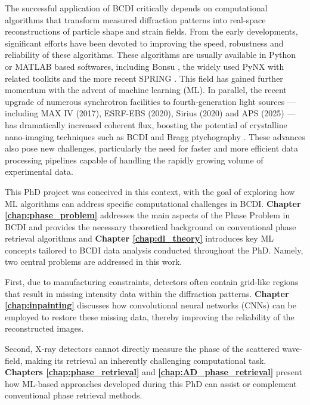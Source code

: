The successful application of BCDI critically depends on computational algorithms that transform measured diffraction 
patterns into real-space reconstructions of particle shape and strain fields. From the early developments,
significant efforts have been devoted to improving the speed, robustness and reliability of these algorithms. These 
algorithms are usually available in Python or MATLAB based softwares, including Bonsu \cite{Newton2012Bonsu}, the widely 
used PyNX \cite{favre-nicolin_pynx_2020} with related toolkits \cite{Simonne2022Gwaihir, Atlan2023cdiutils} and the 
more recent SPRING \cite{Colombo2025SPRING}. 
This field has gained further momentum with the advent of machine learning (ML). In parallel, the recent upgrade of 
numerous synchrotron facilities to fourth-generation light sources — including MAX IV (2017), ESRF-EBS (2020), 
Sirius (2020) and APS (2025) — has dramatically increased coherent flux, boosting the potential of crystalline 
nano-imaging techniques such as BCDI and Bragg ptychography \cite{Li2022, leake_nanodiffraction_2019, PhysRevLett.121.256101, Chamard2015}. These advances also pose new 
challenges, particularly the need for faster and more efficient data processing pipelines capable of handling the rapidly 
growing volume of experimental data.

This PhD project was conceived in this context, with the goal of exploring how ML algorithms can address specific 
computational challenges in BCDI. \textbf{Chapter \ref{chap:phase_problem}} addresses the main aspects of the Phase 
Problem in BCDI and provides the necessary theoretical background on 
conventional phase retrieval algorithms and \textbf{Chapter \ref{chap:dl_theory}} introduces key ML concepts tailored 
to BCDI data analysis conducted throughout the PhD. Namely, two central problems are addressed in this work.

First, due to manufacturing constraints, detectors often contain grid-like regions that result in missing intensity 
data within the diffraction patterns. \textbf{Chapter \ref{chap:inpainting}} discusses how convolutional neural networks 
(CNNs) can be employed to restore these missing data, thereby improving the reliability of the reconstructed images.

Second, X-ray detectors cannot directly measure the phase of the scattered wave-field, making its retrieval an inherently 
challenging computational task. \textbf{Chapters \ref{chap:phase_retrieval}} and \textbf{\ref{chap:AD_phase_retrieval}} 
present how ML-based approaches developed during this PhD can assist or complement conventional phase retrieval methods. 
